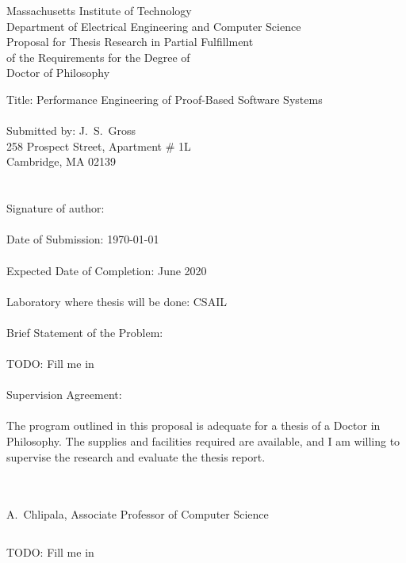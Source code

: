 \documentclass{article}
\begin{document}
\thispagestyle{empty}
\begin{center}
Massachusetts Institute of Technology \\
Department of Electrical Engineering and Computer Science \\ $\left.\right.$ \\
Proposal for Thesis Research in Partial Fulfillment \\
of the Requirements for the Degree of \\
Doctor of Philosophy
\end{center}
\noindent Title: Performance Engineering of Proof-Based Software Systems \\ \\
Submitted by: J.~S.~Gross \\
\phantom{Submitted by: }258 Prospect Street, Apartment \# 1L \\
\phantom{Submitted by: }Cambridge, MA 02139 \\ \\ \\
Signature of author: \underline{\hspace{20em}} \\ \\
Date of Submission: \today \\ \\
Expected Date of Completion: June 2020 \\ \\
Laboratory where thesis will be done: CSAIL \\ \\
Brief Statement of the Problem: \\ \\
TODO: Fill me in \\ \\
Supervision Agreement: \\ \\
The program outlined in this proposal is adequate for a thesis of a Doctor in Philosophy.
The supplies and facilities required are available, and I am willing to supervise the research and evaluate the thesis report. \\ \\
\begin{flushright}
\underline{\hspace*{25em}} \\ $\left.\right.$ \\
A.~Chlipala, Associate Professor of Computer Science
\end{flushright}
\clearpage
$\left.\right.$
\clearpage

TODO: Fill me in

\nocite{*}


\end{document}
